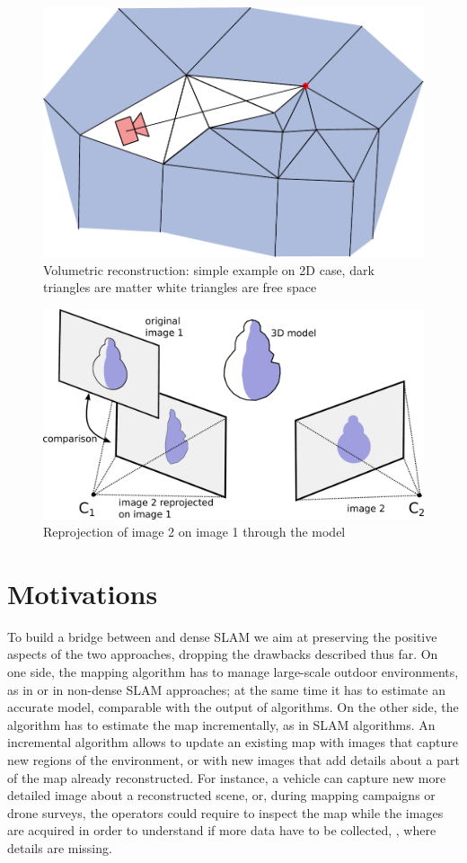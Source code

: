 \begin{figure}[tp]
 \centering
 \includegraphics[width=0.925\columnwidth]{./img/spacecarv}
 \caption{Volumetric reconstruction: simple example on 2D case, dark triangles are matter white triangles are free space}
 \label{fig:Volumetricc}
\end{figure}
\begin{figure}[tp]
 \centering
 \includegraphics[width=0.925\columnwidth]{./img/reprojOr}
 \caption{Reprojection of image 2 on  image 1 through the model}
 \label{fig:reproj}
\end{figure}


\section{Motivations}
To build a bridge between \mvs and dense SLAM we aim at preserving the positive aspects of the two approaches, dropping the drawbacks described thus far. 
On one side, the mapping algorithm has to manage large-scale outdoor environments, as in \mvs or in non-dense SLAM approaches; at the same time it has to estimate an accurate model, comparable with the output of \mvs algorithms.
On the other  side, the algorithm has to estimate the map incrementally, as in SLAM algorithms.
An incremental algorithm allows to update an existing map with images that capture new regions of the environment, or with new images that add details about a part of the map already reconstructed.
For instance, a vehicle can capture new more detailed image about a reconstructed scene, or, during mapping campaigns or drone surveys, the operators could require to inspect the map while the images are  acquired in order to understand if more data have to be collected, \eg, where details are missing.


